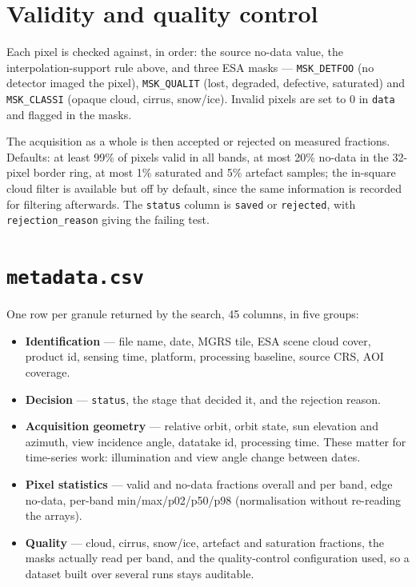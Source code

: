 \documentclass[10pt,a4paper]{article}
\begin{document}
\section{Validity and quality control}

Each pixel is checked against, in order: the source no-data value, the interpolation-support rule
above, and three ESA masks --- \texttt{MSK\_DETFOO} (no detector imaged the pixel),
\texttt{MSK\_QUALIT} (lost, degraded, defective, saturated) and \texttt{MSK\_CLASSI} (opaque
cloud, cirrus, snow/ice). Invalid pixels are set to 0 in \texttt{data} and flagged in the masks.

The acquisition as a whole is then accepted or rejected on measured fractions. Defaults: at least
99\% of pixels valid in all bands, at most 20\% no-data in the 32-pixel border ring, at most 1\%
saturated and 5\% artefact samples; the in-square cloud filter is available but off by default,
since the same information is recorded for filtering afterwards. The \texttt{status} column is
\texttt{saved} or \texttt{rejected}, with \texttt{rejection\_reason} giving the failing test.

\section{\texttt{metadata.csv}}

One row per granule returned by the search, 45 columns, in five groups:

\begin{itemize}\setlength{\itemsep}{0pt}
  \item \textbf{Identification} --- file name, date, MGRS tile, ESA scene cloud cover, product
        id, sensing time, platform, processing baseline, source CRS, AOI coverage.
  \item \textbf{Decision} --- \texttt{status}, the stage that decided it, and the rejection reason.
  \item \textbf{Acquisition geometry} --- relative orbit, orbit state, sun elevation and azimuth,
        view incidence angle, datatake id, processing time. These matter for time-series work:
        illumination and view angle change between dates.
  \item \textbf{Pixel statistics} --- valid and no-data fractions overall and per band, edge
        no-data, per-band min/max/p02/p50/p98 (normalisation without re-reading the arrays).
  \item \textbf{Quality} --- cloud, cirrus, snow/ice, artefact and saturation fractions, the
        masks actually read per band, and the quality-control configuration used, so a dataset
        built over several runs stays auditable.
\end{itemize}
\end{document}
